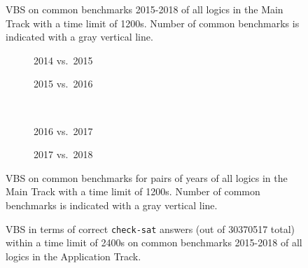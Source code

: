 \documentclass[dvipsnames,table,twoside,11pt]{article}
\newcommand{\maintrack}{Main Track\xspace}
\newcommand{\apptrack}{Application Track\xspace}
\begin{document}

\begin{figure}
  \centering
  \caption{VBS on common benchmarks 2015-2018 of all logics in the \maintrack 
  with a time limit of 1200s. Number of common benchmarks is indicated with a
  gray vertical line.}
  \label{fig:progress-all}
\end{figure}

\begin{figure}
  \begin{subfigure}[t]{0.5\textwidth}
    \caption{2014 vs.~2015}
  \end{subfigure}
  \begin{subfigure}[t]{0.5\textwidth}
    \caption{2015 vs.~2016}
  \end{subfigure}
  \\[2ex]
  \begin{subfigure}[t]{0.5\textwidth}
    \caption{2016 vs.~2017}
  \end{subfigure}
  \begin{subfigure}[t]{0.5\textwidth}
    \caption{2017 vs.~2018}
  \end{subfigure}
  \caption{VBS on common benchmarks for pairs of years of all logics in the
  \maintrack with a time limit of 1200s. Number of common benchmarks is
  indicated with a gray vertical line.}
  \label{fig:progress}
\end{figure}

\begin{figure}
  \centering
  \vspace{-5ex}
  \caption{VBS in terms of correct \texttt{check-sat} answers
  (out of 30370517 total)
  within a time limit of 2400s
  on common benchmarks 2015-2018 of all logics in the \apptrack.}
  \label{fig:progress-all-app}
\end{figure}
\end{document}
